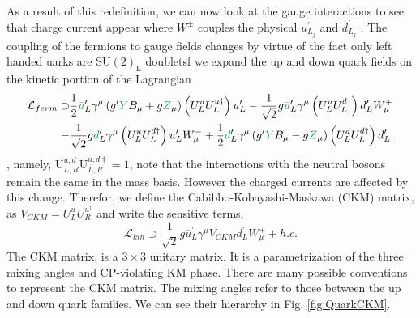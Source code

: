 As a result of this redefinition, we can now look at the gauge interactions to see that  charge current appear where $W^\pm$ couples  the physical $u^\prime_{L_j}$ and $d^\prime_{L_j}$ . 
%
The coupling of the  fermions to  gauge fields changes by virtue of the fact  only left handed uarks are $\mathrm{SU(2)_L}$ doubletsf we expand the up and down quark fields on the kinetic portion of the Lagrangian
%
\begin{equation}\label{LagFermFCCCs}
\begin{aligned}
\mathcal{L}_{ferm} \supset & 
\frac{1}{2} \Joaoadd{\bar{u}}^\prime_L \gamma^\mu \left( g^\prime \Joaoadd{Y} B_\mu + g \Joaoadd{Z}_\mu  \right) \left(U^u_L U^{u \dagger}_L \right) u^\prime_L - \frac{1}{\sqrt{2}} g \Joaoadd{\bar{u}}^\prime_L \gamma^\mu \left( U^u_L U^{d \dagger}_L \right) d^\prime_L W^+_\mu \\   
- 
& \frac{1}{\sqrt{2}} g \Joaoadd{\bar{d}}^\prime_L \gamma^\mu \left( U^u_L U^{d \dagger}_L \right) u^\prime_L W^-_\mu 
+ 
\frac{1}{2} \Joaoadd{\bar{d}}^\prime_L \gamma^\mu \left( g^\prime \Joaoadd{Y} B_\mu - g \Joaoadd{Z}_\mu \right) \left( U^d_L U^{d \dagger}_L \right) d^\prime_L.  
\end{aligned}
\end{equation}
%
, namely, $ \mathrm{U}^{u,d}_{L,R} \mathrm{U}^{u,d \dagger}_{L,R} = 1$,  note that the interactions with the neutral bosons remain the same in the mass basis.
%
However the charged currents are affected by this change.
%
Therefor, we define the Cabibbo-Kobayashi-Maskawa (CKM) matrix, as $V_{CKM} = U^u_L U^{u ^\dagger }_R $ and write the sensitive terms,
%
\begin{equation}
\mathcal{L}_{kin} \supset \frac{1}{\sqrt{2}} g \overline{u}^\prime_L \gamma^\mu V_{CKM} d_L^\prime W^+_\mu + h.c. 
\end{equation}
%
The CKM matrix, is a $3 \times 3$ unitary matrix. It is a parametrization of the three mixing angles and CP-violating KM phase. There are many possible conventions to represent the CKM matrix.
%
The mixing angles refer to those between the up and down quark families. We can see their hierarchy in Fig. \ref{fig:QuarkCKM}.


